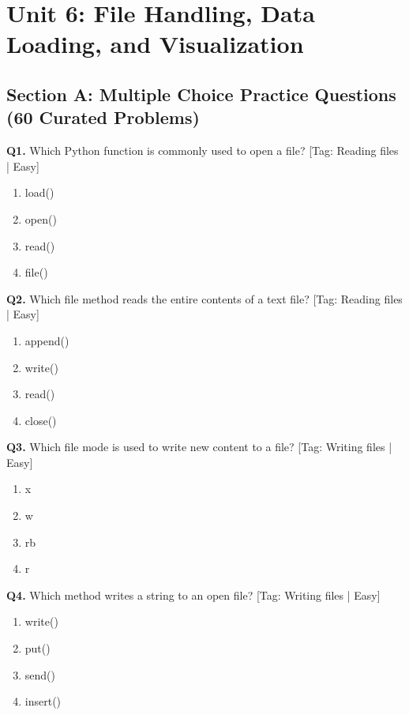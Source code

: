 \chapter{Unit 6: File Handling, Data Loading, and Visualization}

\section{Section A: Multiple Choice Practice Questions (60 Curated Problems)}

\noindent\textbf{Q1.} Which Python function is commonly used to open a file? \hfill [Tag: Reading files | Easy]
\begin{enumerate}[label=(\alph*),topsep=2pt,itemsep=1pt,partopsep=0pt,parsep=0pt]
    \item {load()}
    \item {open()}
    \item {read()}
    \item {file()}
\end{enumerate}
\vspace{2mm}
\noindent\textbf{Q2.} Which file method reads the entire contents of a text file? \hfill [Tag: Reading files | Easy]
\begin{enumerate}[label=(\alph*),topsep=2pt,itemsep=1pt,partopsep=0pt,parsep=0pt]
    \item {append()}
    \item {write()}
    \item {read()}
    \item {close()}
\end{enumerate}
\vspace{2mm}
\noindent\textbf{Q3.} Which file mode is used to write new content to a file? \hfill [Tag: Writing files | Easy]
\begin{enumerate}[label=(\alph*),topsep=2pt,itemsep=1pt,partopsep=0pt,parsep=0pt]
    \item {x}
    \item {w}
    \item {rb}
    \item {r}
\end{enumerate}
\vspace{2mm}
\noindent\textbf{Q4.} Which method writes a string to an open file? \hfill [Tag: Writing files | Easy]
\begin{enumerate}[label=(\alph*),topsep=2pt,itemsep=1pt,partopsep=0pt,parsep=0pt]
    \item {write()}
    \item {put()}
    \item {send()}
    \item {insert()}
\end{enumerate}
